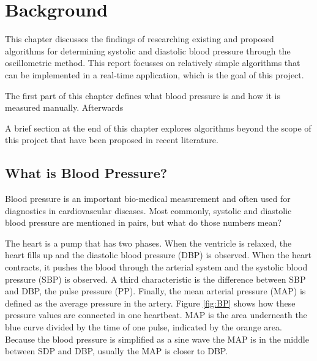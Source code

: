 \chapter{Background}\label{cp:theory}
This chapter discusses the findings of researching existing and proposed algorithms for determining systolic and diastolic blood pressure through the oscillometric method. This report focusses on relatively simple algorithms that can be implemented in a real-time application, which is the goal of this project.

The first part of this chapter defines what blood pressure is and how it is measured manually. Afterwards

A brief section at the end of this chapter explores algorithms beyond the scope of this project that have been proposed in recent literature.

\section{What is Blood Pressure?}
Blood pressure is an important bio-medical measurement and often used for diagnostics in cardiovascular diseases. Most commonly, systolic and diastolic blood pressure are mentioned in pairs, but what do those numbers mean?

The heart is a pump that has two phases. When the ventricle is relaxed, the heart fills up and the diastolic blood pressure (DBP) is observed. When the heart contracts, it pushes the blood through the arterial system and the systolic blood pressure (SBP) is observed. A third characteristic is the difference between SBP and DBP, the pulse pressure (PP). Finally, the mean arterial pressure (MAP) is defined as the average pressure in the artery. Figure \ref{fig:BP} shows how these pressure values are connected in one heartbeat. MAP is the area underneath the blue curve divided by the time of one pulse, indicated by the orange area. \cite{Boron2012} Because the blood pressure is simplified as a sine wave the MAP is in the middle between SDP and DBP, usually the MAP is closer to DBP. \paragraph{}

